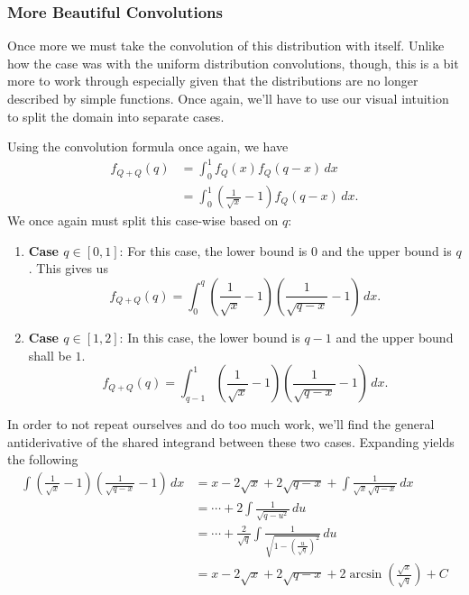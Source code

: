 \subsubsection{More Beautiful Convolutions}

Once more we must take the convolution of this distribution with itself. Unlike
how the case was with the uniform distribution convolutions, though, this is a
bit more to work through especially given that the distributions are no longer
described by simple functions. Once again, we'll have to use our visual
intuition to split the domain into separate cases.

Using the convolution formula once again, we have
\begin{align*}
    f_{Q+Q} \left( q \right) &= \int_{0}^{1} f_Q \left( x \right) f_Q \left( q - x \right) \, dx \\
    &= \int_{0}^{1} \left( \frac{1}{\sqrt{x}} - 1 \right) f_Q \left( q - x \right) \, dx
.\end{align*}
We once again must split this case-wise based on \( q \):
\begin{enumerate}
    \item \textbf{Case \( q \in \left[ 0, 1 \right] \)}:
    For this case, the lower bound is \( 0 \) and the upper bound is \( q \).
    This gives us
    \[
        f_{Q+Q} \left( q \right) = \int_{0}^{q} \left( \frac{1}{\sqrt{x}} - 1 \right) \left( \frac{1}{\sqrt{q - x}} - 1 \right) \, dx
    .\]


    \item \textbf{Case \( q \in \left[ 1, 2 \right] \)}:
    In this case, the lower bound is \( q - 1 \) and the upper bound shall be
    \( 1 \).
    \[
        f_{Q+Q} \left( q \right) = \int_{q - 1}^{1} \left( \frac{1}{\sqrt{x}} - 1 \right) \left( \frac{1}{\sqrt{q - x}} - 1 \right) \, dx
    .\]
\end{enumerate}
In order to not repeat ourselves and do too much work, we'll find the general
antiderivative of the shared integrand between these two cases. Expanding yields the following
\begin{align*}
    \int \left( \frac{1}{\sqrt{x}} - 1 \right) \left( \frac{1}{\sqrt{q - x}} - 1 \right) \, dx &= x - 2 \sqrt{x} + 2 \sqrt{q - x} + \int \frac{1}{\sqrt{x} \sqrt{q - x}} \, dx \\
    &= \cdots + 2\int \frac{1}{\sqrt{q - u^2}} \, du \\
    &= \cdots + \frac{2}{\sqrt{q}} \int \frac{1}{\sqrt{1 - \left( \frac{u}{\sqrt{q}} \right)^2}} \, du \\
    &= x - 2 \sqrt{x} + 2 \sqrt{q - x} + 2 \arcsin{\left( \frac{\sqrt{x}}{\sqrt{q}} \right)} + C
\end{align*}
